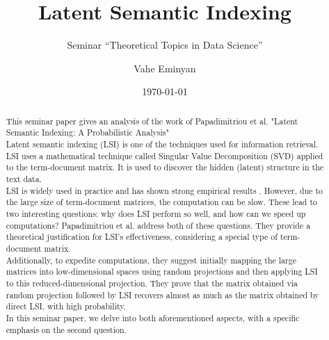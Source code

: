 \documentclass[a4paper,11pt,DIV=15]{scrartcl} %
\theoremstyle{plain}
\theoremstyle{definition}
\begin{document}
\subtitle{Seminar ``Theoretical Topics in Data Science''}
\date{\today}
\publishers{RWTH Aachen University}	%

\title{Latent Semantic Indexing}

\author{Vahe Eminyan}

\maketitle


\begin{abstract}
This seminar paper gives an analysis of the work of  Papadimitriou et al. "Latent Semantic Indexing: A Probabilistic Analysis" \cite{APAPADIMITRIOU2000217}\\
Latent semantic indexing (LSI) is one of the techniques used for information retrieval.
LSI uses a mathematical technique called Singular Value Decomposition (SVD) applied to the term-document matrix. It is used to discover the hidden (latent) structure in the text data.\\
LSI is widely used in practice and has shown strong empirical results \cite{LSIusage1, LSIusage2, LSIusage3}. However, due to the large size of term-document matrices, the computation can be slow.
These lead to two interesting questions: why does LSI perform so well, and how can we speed up computations?
Papadimitriou et al. address both of these questions.
They provide a theoretical justification for LSI's effectiveness, considering a special type of term-document matrix.\\
Additionally, to expedite computations, they suggest initially mapping the large matrices into low-dimensional spaces using random projections and then applying LSI to this reduced-dimensional projection.
They prove that the matrix obtained via random projection followed by LSI recovers almost as
much as the matrix obtained by direct LSI, with high probability.\\
In this seminar paper, we delve into both aforementioned aspects, with a specific emphasis on the second question. 





\end{abstract}

\thispagestyle{empty}
\end{document}
